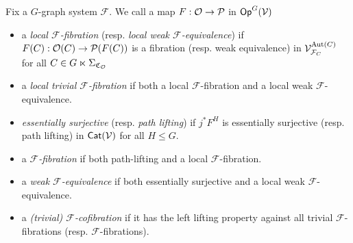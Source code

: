 \documentclass[a4paper,10pt
,draft
]{article}%
\renewcommand{\F}{\mathcal F}
\renewcommand{\1}{\eta}%
\begin{document}
\begin{definition}
      \label{MODEL_DEFN}
      Fix a $G$-graph system $\F$.
      We call a map $F: \mathcal{O} \to \mathcal{P}$ in $\mathsf{Op}^G(\mathcal V)$
      \begin{itemize}
      \item a {\em local $\F$-fibration} (resp. {\em local weak $\F$-equivalence}) if
            $F(C): \mathcal{O}(C)\to \mathcal{P}(F(C))$
            is a fibration (resp. weak equivalence) in $\V^{\Aut(C)}_{\F_C}$ for all $C \in G \ltimes \Sigma_{\mathfrak C_{\mathcal{O}}}$
      \item a {\em local trivial $\F$-fibration} if both a local $\F$-fibration and a local weak $\F$-equivalence.
      \item {\em essentially surjective} (resp. {\em path lifting}) if $j^*F^H$ is essentially surjective (resp. path lifting) in $\mathsf{Cat}(\mathcal V)$ for all $H\leq G$.
      \item a {\em $\F$-fibration} if both path-lifting and a local $\F$-fibration.
      \item a {\em weak $\F$-equivalence} if both essentially surjective and a local weak $\F$-equivalence.
      \item a \textit{(trivial) $\F$-cofibration} if it has the left lifting property against all trivial $\F$-fibrations (resp. $\F$-fibrations).
      \end{itemize}
\end{definition}


\end{document}
